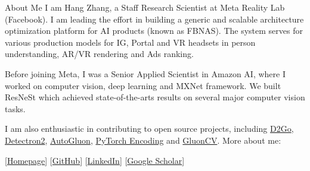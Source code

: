\documentclass{resume} %
\begin{document}
\begin{rSection}{About Me}
I am Hang Zhang, a Staff Research Scientist at Meta Reality Lab (Facebook). 
I am leading the effort in building a generic and scalable architecture optimization platform for AI products (known as FBNAS). The system serves for various production models for IG, Portal and VR headsets in person understanding, AR/VR  rendering and Ads ranking. 

Before joining Meta, I was a Senior Applied Scientist in Amazon AI, where I worked on computer vision, deep learning and MXNet framework. We built ResNeSt which achieved state-of-the-arts results on several major computer vision tasks.


I am also enthusiastic in contributing to open source projects, including \href{https://github.com/facebookresearch/d2go}{D2Go}, \href{https://github.com/facebookresearch/detectron2}{Detectron2}, \href{https://github.com/awslabs/autogluon/}{AutoGluon}, \href{https://github.com/zhanghang1989/PyTorch-Encoding}{PyTorch Encoding} and \href{https://github.com/dmlc/gluon-cv}{GluonCV}. More about me:


[\href{https://hangzhang.org/}{Homepage}] [\href{https://github.com/zhanghang1989}{GitHub}] 
[\href{https://www.linkedin.com/in/zhanghang0704}{LinkedIn}] 
[\href{https://scholar.google.com/citations?user=gCoWdkUAAAAJ}{Google Scholar}]
\end{rSection}


\newcommand{\RNum}[1]{\uppercase\expandafter{\romannumeral #1\relax}}
\end{document}
